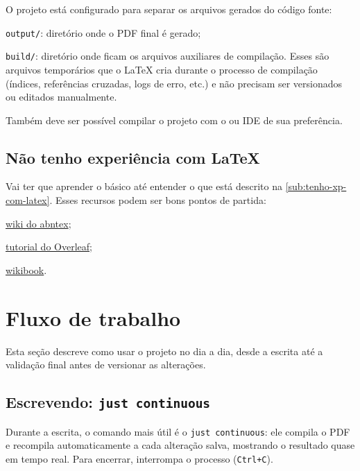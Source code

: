 O projeto está configurado para separar os arquivos gerados do código fonte:

\begin{alineas}
  \item \texttt{output/}: diretório onde o PDF final é gerado;

  \item \texttt{build/}: diretório onde ficam os arquivos auxiliares de compilação. Esses são arquivos temporários que o \LaTeX{} cria durante o processo de compilação (índices, referências cruzadas, logs de erro, etc.) e não precisam ser versionados ou editados manualmente.
\end{alineas}

Também deve ser possível compilar o projeto com o  ou IDE de sua preferência.

\subsection{Não tenho experiência com \LaTeX{}}

Vai ter que aprender o básico até entender o que está descrito na \autoref{sub:tenho-xp-com-latex}. Esses recursos podem ser bons pontos de partida:

\begin{alineas}
  \item \href{https://github.com/abntex/abntex2/wiki}{wiki do abntex};

  \item \href{https://www.overleaf.com/learn/latex/Learn_LaTeX_in_30_minutes}{tutorial do Overleaf};

  \item \href{https://en.wikibooks.org/wiki/LaTeX}{wikibook}.
\end{alineas}

\section{Fluxo de trabalho}

Esta seção descreve como usar o projeto no dia a dia, desde a escrita até a validação final antes de versionar as alterações.

\subsection{Escrevendo: \texttt{just continuous}}

Durante a escrita, o comando mais útil é o \texttt{just continuous}: ele compila o PDF e recompila automaticamente a cada alteração salva, mostrando o resultado quase em tempo real. Para encerrar, interrompa o processo (\texttt{Ctrl+C}).

